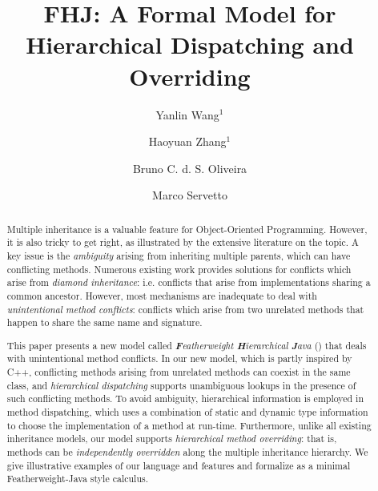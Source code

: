 \documentclass[a4paper,english]{lipics-v2018}
\title{FHJ: A Formal Model for Hierarchical Dispatching and Overriding}
\author{Yanlin Wang$^1$}
{The University of Hong Kong, China}
{ylwang@cs.hku.hk}
{}{}%
\author{Haoyuan Zhang$^1$}
{The University of Hong Kong, China}
{hyzhang@cs.hku.hk}
{}{}
\author{Bruno C. d. S. Oliveira}
{The University of Hong Kong, China}
{bruno@cs.hku.hk}
{}{Funded by Hong Kong Research Grant Council projects number 17210617 and 17258816}
\author{Marco Servetto}
{Victoria University of Wellington, New Zealand}
{marco.servetto@ecs.vuw.ac.nz}
{}{}
\begin{document}
\maketitle

\begin{abstract}
Multiple inheritance is a valuable feature for Object-Oriented
Programming. However, it is also tricky to get right, as illustrated by
the extensive literature on the topic. A key issue 
is the \emph{ambiguity} arising from inheriting multiple parents,
which can have conflicting methods. 
Numerous existing work provides solutions for 
conflicts which arise from \emph{diamond inheritance}: i.e.
conflicts that arise from implementations sharing a common 
ancestor. However, most mechanisms are inadequate to deal 
with \emph{unintentional method conflicts}: conflicts which 
arise from two unrelated methods that happen to share the same name
and signature. 

This paper presents a new model called \emph{\textbf{F}eatherweight
  \textbf{H}ierarchical \textbf{J}ava} (\name{}) that deals with
unintentional method conflicts.  In our new model, which is partly
inspired by C++, conflicting methods arising from unrelated methods
can coexist in the same class, and \emph{hierarchical dispatching}
supports unambiguous lookups in the presence of such conflicting
methods.  To avoid ambiguity, hierarchical information is employed in
method dispatching, which uses a combination of static and dynamic
type information to choose the implementation of a method at run-time.
Furthermore, unlike all existing inheritance models, our model
supports \emph{hierarchical method overriding}: that is, methods can
be \emph{independently overridden} along the multiple inheritance
hierarchy. We give illustrative examples of our language and features
and formalize \name{} as a minimal Featherweight-Java style calculus.
\end{abstract}










\newpage
\appendix

\end{document}

